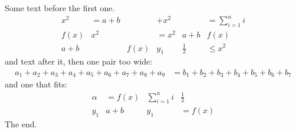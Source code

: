 \documentclass[12pt,b5paper]{article}
\begin{document}
Some text before the first one.
\begin{align}
x^2 & = a+b &  & + x^2 &  & = \sum_{i=1}^n i \\
f(x) &  x^2 &  & = x^2 & a+b &  f(x) \\
a+b &   & f(x) &  y_1 & \frac{1}{2} & \leq x^2
\end{align}
and text after it, then one pair too wide:
\begin{align*}
a_1+a_2+a_3+a_4+a_5+a_6+a_7+a_8+a_9 &= b_1+b_2+b_3+b_4+b_5+b_6+b_7
\end{align*}
and one that fits:
\begin{align}
\alpha & = f(x) & \sum_{i=1}^n i &  \frac{1}{2} \nonumber \\
y_1 &  a+b & y_1 & = f(x)
\end{align}
The end.
\end{document}
